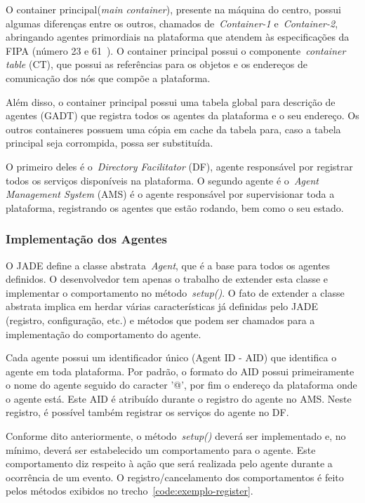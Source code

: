 O container principal(\emph{main container}), presente na máquina do centro, possui algumas diferenças entre os outros, chamados de~\emph{Container-1} e~\emph{Container-2}, abringando agentes primordiais na plataforma que atendem às especificações da FIPA (número 23 e 61~\cite{bellifemineGuide02}). O container principal possui o componente~\emph{container table} (CT), que possui as referências para os objetos e os endereços de comunicação dos nós que compõe a plataforma.

Além disso, o container principal possui uma tabela global para descrição de agentes (GADT) que registra todos os agentes da plataforma e o seu endereço. Os outros containeres possuem uma cópia em cache da tabela para, caso a tabela principal seja corrompida, possa ser substituída.

O primeiro deles é o~\emph{Directory Facilitator} (DF), agente responsável por registrar todos os serviços disponíveis na plataforma. O segundo agente é o~\emph{Agent Management System} (AMS) é o agente responsável por supervisionar toda a plataforma, registrando os agentes que estão rodando, bem como o seu estado. 

\subsubsection{Implementação dos Agentes}
O JADE define a classe abstrata~\emph{Agent}, que é a base para todos os agentes definidos. O desenvolvedor tem apenas o trabalho de extender esta classe e implementar o comportamento no método~\emph{setup()}. O fato de extender a classe abstrata implica em herdar várias características já definidas pelo JADE (registro, configuração, etc.) e métodos que podem ser chamados para a implementação do comportamento do agente.

Cada agente possui um identificador único (Agent ID - AID) que identifica o agente em toda plataforma. Por padrão, o formato do AID possui primeiramente o nome do agente seguido do caracter '@', por fim o endereço da plataforma onde o agente está. Este AID é atribuído durante o registro do agente no AMS. Neste registro, é possível também registrar os serviços do agente no DF.

Conforme dito anteriormente, o método~\emph{setup()} deverá ser implementado e, no mínimo, deverá ser estabelecido um comportamento para o agente. Este comportamento diz respeito à ação que será realizada pelo agente durante a ocorrência de um evento. O registro/cancelamento dos comportamentos é feito pelos métodos exibidos no trecho~\ref{code:exemplo-register}.

